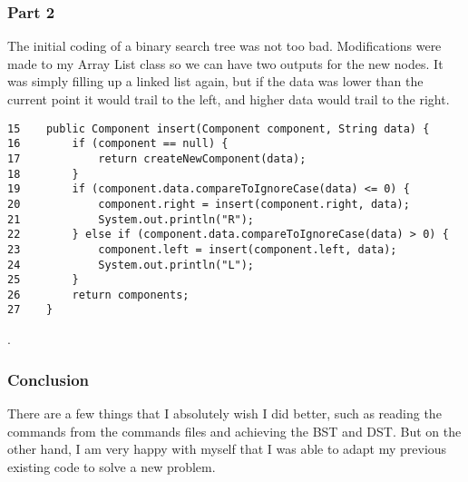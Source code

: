 \documentclass{article}
\begin{document}
\subsubsection{Part 2 }
The initial coding of a binary search tree was not too bad. Modifications were made to my Array List class so we can have two outputs for the new nodes. It was simply filling up a linked list again, but if the data was lower than the current point it would trail to the left, and higher data would trail to the right.

\begin{verbatim}
15    public Component insert(Component component, String data) {
16        if (component == null) {
17            return createNewComponent(data);
18        }
19        if (component.data.compareToIgnoreCase(data) <= 0) {
20            component.right = insert(component.right, data);
21            System.out.println("R");
22        } else if (component.data.compareToIgnoreCase(data) > 0) {
23            component.left = insert(component.left, data);
24            System.out.println("L");
25        }
26        return components;
27    }
\end{verbatim}
.

\subsubsection{Conclusion}
There are a few things that I absolutely wish I did better, such as reading the commands from the commands files and achieving the BST and DST. But on the other hand,  I am very happy with myself that I was able to adapt my previous existing code to solve a new problem.
\end{document}
